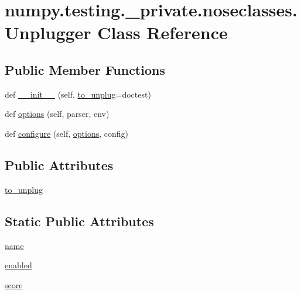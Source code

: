 \hypertarget{classnumpy_1_1testing_1_1__private_1_1noseclasses_1_1Unplugger}{}\section{numpy.\+testing.\+\_\+private.\+noseclasses.\+Unplugger Class Reference}
\label{classnumpy_1_1testing_1_1__private_1_1noseclasses_1_1Unplugger}
\subsection*{Public Member Functions}
\begin{DoxyCompactItemize}
\item 
def \hyperlink{classnumpy_1_1testing_1_1__private_1_1noseclasses_1_1Unplugger_a9df60a7d2769584797b01624ba1a890f}{\+\_\+\+\_\+init\+\_\+\+\_\+} (self, \hyperlink{classnumpy_1_1testing_1_1__private_1_1noseclasses_1_1Unplugger_a52c3bc89785b419c0dc31a5a6fab433d}{to\+\_\+unplug}=\textquotesingle{}doctest\textquotesingle{})
\item 
def \hyperlink{classnumpy_1_1testing_1_1__private_1_1noseclasses_1_1Unplugger_a0b239a2363f7e240b45709c162744922}{options} (self, parser, env)
\item 
def \hyperlink{classnumpy_1_1testing_1_1__private_1_1noseclasses_1_1Unplugger_a6b494ccae1633be27af63f73c296f7c1}{configure} (self, \hyperlink{classnumpy_1_1testing_1_1__private_1_1noseclasses_1_1Unplugger_a0b239a2363f7e240b45709c162744922}{options}, config)
\end{DoxyCompactItemize}
\subsection*{Public Attributes}
\begin{DoxyCompactItemize}
\item 
\hyperlink{classnumpy_1_1testing_1_1__private_1_1noseclasses_1_1Unplugger_a52c3bc89785b419c0dc31a5a6fab433d}{to\+\_\+unplug}
\end{DoxyCompactItemize}
\subsection*{Static Public Attributes}
\begin{DoxyCompactItemize}
\item 
\hyperlink{classnumpy_1_1testing_1_1__private_1_1noseclasses_1_1Unplugger_a5d3082ee17c885d48bc21f1212c5a110}{name}
\item 
\hyperlink{classnumpy_1_1testing_1_1__private_1_1noseclasses_1_1Unplugger_a62f2af1d4cbe61fce2c344995ee87301}{enabled}
\item 
\hyperlink{classnumpy_1_1testing_1_1__private_1_1noseclasses_1_1Unplugger_a13a81cce4f071590b1a9dd43b5f8d5c3}{score}
\end{DoxyCompactItemize}


